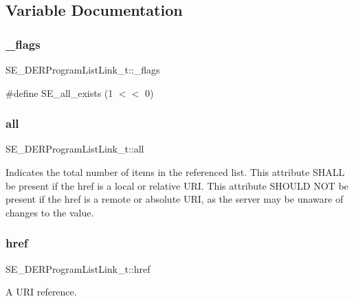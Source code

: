 \subsection{Variable Documentation}
\mbox{\label{group__DERProgramListLink_ga42a0edb4880deca3d413aa643f18d56c}} 
\subsubsection{\texorpdfstring{\+\_\+flags}{\_flags}}
{\footnotesize\ttfamily S\+E\+\_\+\+D\+E\+R\+Program\+List\+Link\+\_\+t\+::\+\_\+flags}

\#define S\+E\+\_\+all\+\_\+exists (1 $<$$<$ 0) \mbox{\label{group__DERProgramListLink_ga18b1991f92601ccd150af4f127efa8cd}} 
\subsubsection{\texorpdfstring{all}{all}}
{\footnotesize\ttfamily S\+E\+\_\+\+D\+E\+R\+Program\+List\+Link\+\_\+t\+::all}

Indicates the total number of items in the referenced list. This attribute S\+H\+A\+LL be present if the href is a local or relative U\+RI. This attribute S\+H\+O\+U\+LD N\+OT be present if the href is a remote or absolute U\+RI, as the server may be unaware of changes to the value. \mbox{\label{group__DERProgramListLink_gafbc96a7ac9d21a98c3a38be05f853758}} 
\subsubsection{\texorpdfstring{href}{href}}
{\footnotesize\ttfamily S\+E\+\_\+\+D\+E\+R\+Program\+List\+Link\+\_\+t\+::href}

A U\+RI reference. 